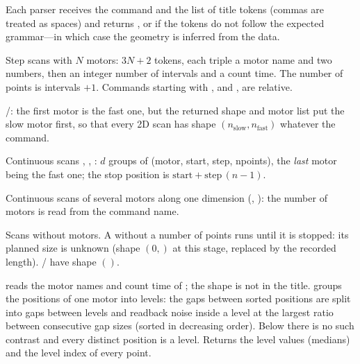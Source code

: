 Each parser receives the command and the list of title tokens (commas are treated as
spaces) and returns , or  if the tokens do not
follow the expected grammar---in which case the geometry is inferred from the data.

Step scans with $N$ motors: $3N+2$ tokens, each triple a motor name and two numbers, then an
integer number of intervals and a count time. The number of points is intervals $+1$.
Commands starting with , and , are relative.

/: the first motor is the fast one, but the returned shape and motor
list put the slow motor first, so that every 2D scan has shape $(n_\mathrm{slow},
n_\mathrm{fast})$ whatever the command.

Continuous scans , , : $d$ groups of (motor, start, step,
npoints), the \emph{last} motor being the fast one; the stop position is $\text{start} +
\text{step}\,(n-1)$.

Continuous scans of several motors along one dimension (, ): the
number of motors is read from the command name.

Scans without motors. A  without a number of points runs until it is stopped:
its planned size is unknown (shape $(0,)$ at this stage, replaced by the recorded length).
/ have shape $()$.

 reads the motor names and count time of
; the shape is not in the title.
 groups the positions of one motor into levels: the gaps between sorted
positions are split into gaps between levels and readback noise inside a level at the largest
ratio between consecutive gap sizes (sorted in decreasing order). Below  there
is no such contrast and every distinct position is a level. Returns the level values
(medians) and the level index of every point.

